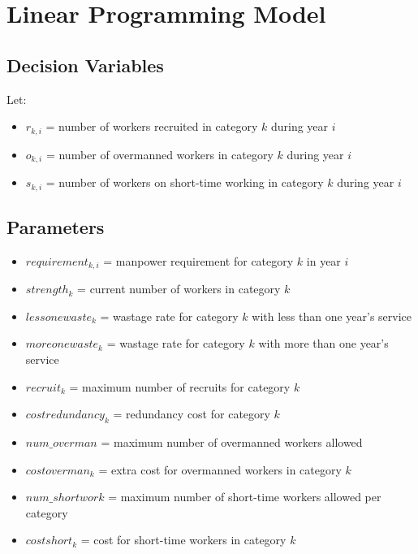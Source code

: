 \documentclass{article}
\begin{document}
\section*{Linear Programming Model}

\subsection*{Decision Variables}
Let:
\begin{itemize}
    \item \( r_{k,i} \) = number of workers recruited in category \( k \) during year \( i \)
    \item \( o_{k,i} \) = number of overmanned workers in category \( k \) during year \( i \)
    \item \( s_{k,i} \) = number of workers on short-time working in category \( k \) during year \( i \)
\end{itemize}

\subsection*{Parameters}
\begin{itemize}
    \item \( requirement_{k,i} \) = manpower requirement for category \( k \) in year \( i \)
    \item \( strength_{k} \) = current number of workers in category \( k \)
    \item \( lessonewaste_{k} \) = wastage rate for category \( k \) with less than one year's service
    \item \( moreonewaste_{k} \) = wastage rate for category \( k \) with more than one year's service
    \item \( recruit_{k} \) = maximum number of recruits for category \( k \)
    \item \( costredundancy_{k} \) = redundancy cost for category \( k \)
    \item \( num\_overman \) = maximum number of overmanned workers allowed
    \item \( costoverman_{k} \) = extra cost for overmanned workers in category \( k \)
    \item \( num\_shortwork \) = maximum number of short-time workers allowed per category
    \item \( costshort_{k} \) = cost for short-time workers in category \( k \)
\end{itemize}
\end{document}
